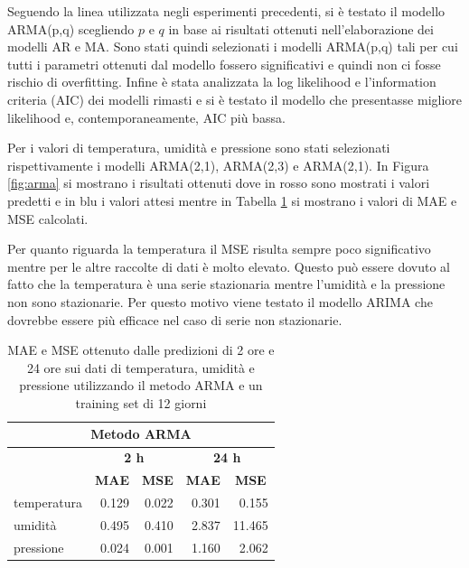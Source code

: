 \documentclass{article}
\begin{document}
Seguendo la linea utilizzata negli esperimenti precedenti, si è testato il modello ARMA(p,q) scegliendo $p$ e $q$ in base ai risultati ottenuti nell'elaborazione dei modelli AR e MA. Sono stati quindi selezionati i modelli ARMA(p,q) tali per cui tutti i parametri ottenuti dal modello fossero significativi e quindi non ci fosse rischio di overfitting. Infine è stata analizzata la log likelihood e l'information criteria (AIC) dei modelli rimasti e si è testato il modello che presentasse migliore likelihood e, contemporaneamente, AIC più bassa.

Per i valori di temperatura, umidità e pressione sono stati selezionati rispettivamente i modelli ARMA(2,1), ARMA(2,3) e ARMA(2,1). In Figura \ref{fig:arma} si mostrano i risultati ottenuti dove in rosso sono mostrati i valori predetti e in blu i valori attesi mentre in Tabella \ref{tab:arma} si mostrano i valori di MAE e MSE calcolati.

Per quanto riguarda la temperatura il MSE risulta sempre poco significativo mentre per le altre raccolte di dati è molto elevato. Questo può essere dovuto al fatto che la temperatura è una serie stazionaria mentre l'umidità e la pressione non sono stazionarie. Per questo motivo viene testato il modello ARIMA che dovrebbe essere più efficace nel caso di serie non stazionarie.

\begin{table}
\centering
\begin{tabular}{l|r|r|r|r}
\multicolumn{5}{c}{{\cellcolor[rgb]{0.875,0.875,0.875}} Metodo ARMA}                                                                                                                          \\ 
\hline
\rowcolor[rgb]{0.753,0.753,0.753}             & \multicolumn{2}{c|}{\textbf{ 2 h}}                                    & \multicolumn{2}{c}{\textbf{24 h }}                                    \\
\rowcolor[rgb]{0.753,0.753,0.753}             & \multicolumn{1}{c|}{\textbf{MAE}} & \multicolumn{1}{c|}{\textbf{MSE}} & \multicolumn{1}{c|}{\textbf{MAE}} & \multicolumn{1}{c}{\textbf{MSE}}  \\ 
\hline
\rowcolor[rgb]{0.875,0.875,0.875} temperatura & 0.129                             & 0.022                             & 0.301                             & 0.155                             \\
umidità                                       & 0.495                             & 0.410                             & 2.837                             & 11.465                            \\
\rowcolor[rgb]{0.875,0.875,0.875} pressione   & 0.024                             & 0.001                             & 1.160                             & 2.062                            
\end{tabular}
\caption{MAE e MSE ottenuto dalle predizioni di 2 ore e 24 ore sui dati di temperatura, umidità e pressione utilizzando il metodo ARMA e un training set di 12 giorni}
\label{tab:arma}
\end{table}
\end{document}
